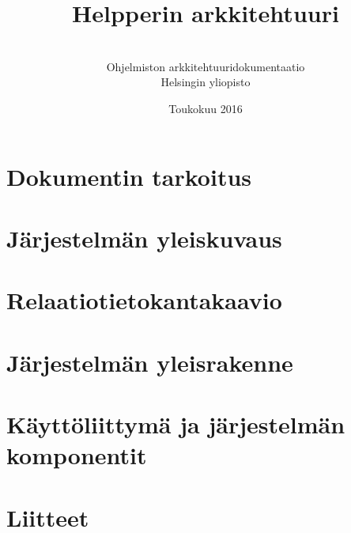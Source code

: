 \documentclass[a4paper,12pt, titlepage]{article}
\title{Helpperin arkkitehtuuri}
\author{ \\[1cm] Ohjelmiston arkkitehtuuridokumentaatio \\ Helsingin yliopisto}
\date{Toukokuu 2016}
\begin{document}
\maketitle

\tableofcontents

\section{Dokumentin tarkoitus}

\section{Järjestelmän yleiskuvaus}

\section{Relaatiotietokantakaavio}

\section{Järjestelmän yleisrakenne}

\section{Käyttöliittymä ja järjestelmän komponentit}

\section{Liitteet}
\end{document}
